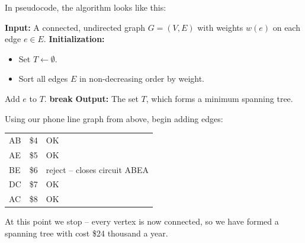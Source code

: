 In pseudocode,  the algorithm looks like this:
\begin{algorithm}[H]
\caption{Kruskal's Algorithm}
\begin{algorithmic}[1]
\State \textbf{Input:} A connected, undirected graph \( G = (V, E) \) with weights \( w(e) \) on each edge \( e \in E \).
\State \textbf{Initialization:}
  \begin{itemize}
    \item Set \( T \gets \emptyset \).
    \item Sort all edges \( E \) in non-decreasing order by weight.
  \end{itemize}
    \State Add \( e \) to \( T \).
  \EndIf
    \State \textbf{break}
  \EndIf
\EndFor
\State \textbf{Output:} The set \( T \), which forms a minimum spanning tree.
\end{algorithmic}
\end{algorithm}
\begin{example}{}{} %
Using our phone line graph from above, begin adding edges:\\
\begin{minipage}{.5\textwidth}
\begin{tabular}{lll}
AB&	\$4&	OK\\
AE	&\$5	&OK\\
BE	&\$6&	reject -- closes circuit ABEA\\
DC	&\$7&	OK\\
AC&\$8&	OK\\
\end{tabular}
\end{minipage}
%
\begin{minipage}{.5\textwidth}
\end{minipage}

At this point we stop -- every vertex is now connected, so we have formed a spanning tree with cost \$24 thousand a year.
\end{example}

